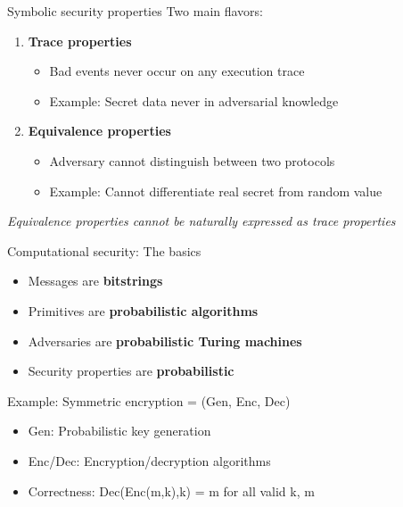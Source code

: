\documentclass[aspectratio=169, lualatex, handout]{beamer}
\begin{document}
\begin{frame}{Symbolic security properties}
	Two main flavors:
	\vspace{1em}
	\begin{enumerate}
		\item \textbf{Trace properties}
		      \begin{itemize}
			      \item Bad events never occur on any execution trace
			      \item Example: Secret data never in adversarial knowledge
		      \end{itemize}
		      \vspace{0.5em}
		\item \textbf{Equivalence properties}
		      \begin{itemize}
			      \item Adversary cannot distinguish between two protocols
			      \item Example: Cannot differentiate real secret from random value
		      \end{itemize}
	\end{enumerate}
	\vspace{1em}
	\begin{center}
		\textit{Equivalence properties cannot be naturally expressed as trace properties}
	\end{center}
\end{frame}

\begin{frame}{Computational security: The basics}
	\begin{itemize}
		\item Messages are \textbf{bitstrings}
		\item Primitives are \textbf{probabilistic algorithms}
		\item Adversaries are \textbf{probabilistic Turing machines}
		\item Security properties are \textbf{probabilistic}
	\end{itemize}
	\vspace{1em}
	Example: Symmetric encryption = (Gen, Enc, Dec)
	\begin{itemize}
		\item Gen: Probabilistic key generation
		\item Enc/Dec: Encryption/decryption algorithms
		\item Correctness: Dec(Enc(m,k),k) = m for all valid k, m
	\end{itemize}
\end{frame}
\end{document}
